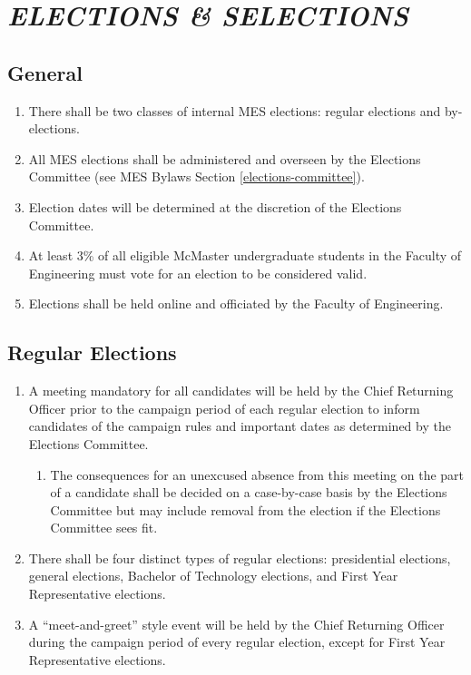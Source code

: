 
\hypertarget{elections-selections}{%
 \section{\texorpdfstring{\emph{ELECTIONS \&
     SELECTIONS}}{ELECTIONS \& SELECTIONS}}
 \label{elections-selections}}
\hypertarget{elections-general}{%
 \subsection{General}
 \label{elections-general}}
\begin{enumerate}
 \item
  There shall be two classes of internal MES elections: regular
  elections and by-elections.
 \item
  All MES elections shall be administered and overseen by the Elections
  Committee (see MES Bylaws Section \ref{elections-committee}).
 \item
  Election dates will be determined at the discretion of the Elections
  Committee.
 \item
  At least 3\% of all eligible McMaster undergraduate students in the
  Faculty of Engineering must vote for an election to be considered
  valid.
 \item
  Elections shall be held online and officiated by the Faculty of
  Engineering.

\end{enumerate}

\hypertarget{regular-elections}{%
 \subsection{Regular Elections}
 \label{regular-elections}}
\begin{enumerate}
 \item
  A meeting mandatory for all candidates will be held by the Chief
  Returning Officer prior to the campaign period of each regular
  election to inform candidates of the campaign rules and important
  dates as determined by the Elections Committee.

  \begin{enumerate}
   \item
    The consequences for an unexcused absence from this meeting on the
    part of a candidate shall be decided on a case-by-case basis by the
    Elections Committee but may include removal from the election if the
    Elections Committee sees fit.
  \end{enumerate}
 \item
  There shall be four distinct types of regular elections: presidential
  elections, general elections, Bachelor of Technology elections, and
  First Year Representative elections.
 \item
  A ``meet-and-greet'' style event will be held by the Chief Returning
  Officer during the campaign period of every regular election, except
  for First Year Representative elections.

\end{enumerate}

